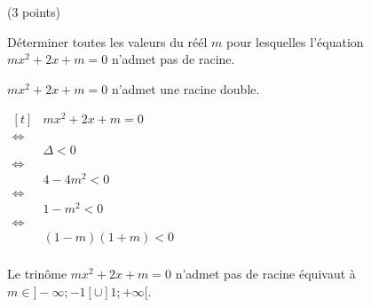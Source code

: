 \documentclass[a4paper,11pt]{article}
\theoremstyle{break}
\begin{document}
  \begin{exo}(3 points)
  
Déterminer toutes les valeurs du réél $m$ pour lesquelles l'équation $mx^2+2x+m=0$ n'admet pas de racine.

\begin{correction}
 $mx^2+2x+m=0$ n'admet une racine double.
 
 \vspace{0.5cm}
 
$
\begin{aligned}[t]
           & mx^2+2x+m=0 \\ %
      \iff \\
           & \Delta<0\\
      \iff \\
           & 4-4m^2<0\\
      \iff \\
           & 1-m^2<0\\
      \iff \\
           & (1-m)(1+m)<0\\
\end{aligned}$

Le trin\^ome $mx^2+2x+m=0$ n'admet pas de racine \'equivaut \`a $m \in ]-\infty;-1[ \cup ]1;+\infty[$.
\end{correction}

    
  \end{exo}
  
 
  \vspace{0.5cm}
  ~
  
\end{document}
